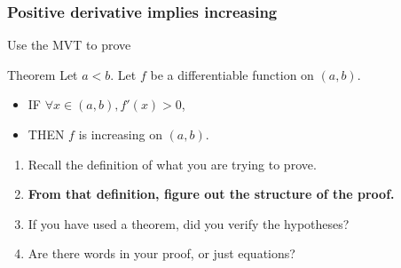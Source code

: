 \documentclass[14pt]{beamer}
\begin{document}
	\begin{frame}[t]
		\frametitle{Positive derivative implies increasing}

		Use the MVT to prove

		\begin{block}{Theorem}
			Let $a < b$. Let $f$ be a differentiable function on $(a,b)$.
			\begin{itemize}
				\item IF $\forall x \in (a,b), f'(x) >0$,

				\item THEN $f$ is increasing on $(a,b)$.
			\end{itemize}
		\end{block}

		\pause

		\begin{enumerate}
			\item Recall the definition of what you are trying to prove.

			\item {\bf From that definition, figure out the structure of the proof.}

			\item If you have used a theorem, did you verify the hypotheses?

			\item Are there words in your proof, or just equations?
		\end{enumerate}
	\end{frame}
\end{document}
